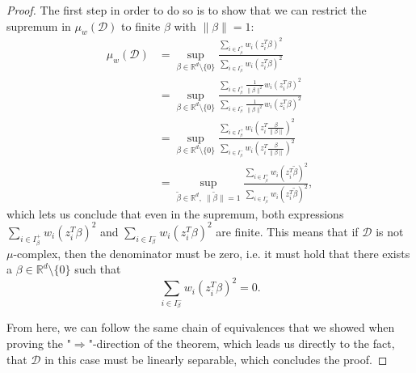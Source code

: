 \begin{proof}
The first step in order to do so is to show that we can restrict the
supremum in $\mu_w(\mathcal{D})$ to finite $\beta$ with
$\lVert \beta \rVert = 1$:
\begin{align*}
    \mu_w(\mathcal{D}) & = \sup_{\beta \in \mathbb{R}^d \setminus \{0\}}
    \frac{\sum_{i \in I_\beta^+} w_i (z_i^T \beta)^2}
    {\sum_{i \in I_\beta^-} w_i (z_i^T \beta)^2}                                         \\ & =
    \sup_{\beta \in \mathbb{R}^d \setminus \{0\}}
    \frac{\sum_{i \in I_\beta^+} \frac{1}{\lVert \beta \rVert^2}w_i (z_i^T \beta)^2}
    {\sum_{i \in I_\beta^-} \frac{1}{\lVert \beta \rVert^2} w_i (z_i^T \beta)^2}         \\
                       & =
    \sup_{\beta \in \mathbb{R}^d \setminus \{0\}}
    \frac{\sum_{i \in I_\beta^+} w_i \left(z_i^T \frac{\beta}{\lVert \beta \rVert}\right)^2}
    {\sum_{i \in I_\beta^-}  w_i \left(z_i^T \frac{\beta}{\lVert \beta \rVert}\right)^2} \\
                       & =
    \sup_{\tilde\beta \in \mathbb{R}^d,\ \lVert \tilde\beta \rVert = 1}
    \frac{\sum_{i \in I_\beta^+} w_i \left(z_i^T \tilde\beta \right)^2}
    {\sum_{i \in I_\beta^-}  w_i \left(z_i^T \tilde\beta \right)^2},
\end{align*}
which lets us conclude that even in the supremum, both expressions
$\sum_{i \in I_\beta^+} w_i (z_i^T \beta )^2$
and
$\sum_{i \in I_\beta^-}  w_i (z_i^T \beta )^2$
are finite.
This means that if $\mathcal{D}$ is not $\mu$-complex, then
the denominator must be zero, i.e. it must hold that there exists
a $\beta \in \mathbb{R}^d \setminus \{0\}$ such that
\begin{equation*}
    \sum_{i \in I_\beta^-}  w_i (z_i^T \beta )^2 = 0.
\end{equation*}

From here, we can follow the same chain of equivalences that we
showed when proving the "$\Rightarrow$"-direction of the theorem,
which leads us directly to the fact, that $\mathcal{D}$ in this case must
be linearly separable, which concludes the proof.
\end{proof}

